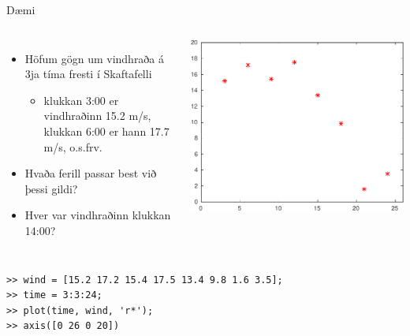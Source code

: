 \documentclass[handout]{beamer}
\begin{document}
\begin{frame}[fragile]{Dæmi}
\begin{columns}
\small
{}
\begin{itemize}
 \item Höfum gögn um vindhraða á 3ja tíma fresti í Skaftafelli 
 \begin{itemize}
  \item klukkan 3:00 er vindhraðinn 15.2 m/s, klukkan 6:00 er hann 17.7 m/s, o.s.frv.
 \end{itemize}
 \item Hvaða ferill passar best við þessi gildi?
 \item Hver var vindhraðinn klukkan 14:00?
\end{itemize}
\includegraphics[width=\linewidth]{Pics/vindur}
\end{columns}
\begin{verbatim}
>> wind = [15.2 17.2 15.4 17.5 13.4 9.8 1.6 3.5];
>> time = 3:3:24;
>> plot(time, wind, 'r*'); 
>> axis([0 26 0 20])
\end{verbatim}
\end{frame}
\end{document}
